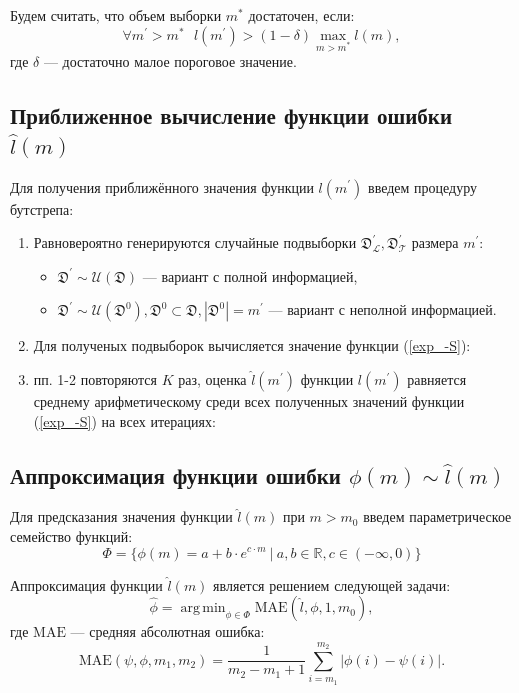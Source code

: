 \documentclass[12pt, a4paper]{scrartcl}
\DeclareMathOperator*{\argmin}{arg\,min}
\theoremstyle{plain}
\theoremstyle{definition}
\begin{document}
Будем считать, что объем выборки $m^*$ достаточен, если:
$$
\forall m^{\prime} > m^* ~~~ l(m^{\prime}) > (1 - \delta)\max\limits_{m > m^*}l(m),
$$
где $\delta$ --- достаточно малое пороговое значение.

\subsection{Приближенное вычисление функции ошибки $\hat{l}(m)$}

Для получения приближённого значения функции $l(m^{\prime})$ введем процедуру бутстрепа:

\begin{enumerate}
	\item Равновероятно генерируются случайные подвыборки $\mathfrak D^{\prime}_{\mathcal{L}}, \mathfrak D^{\prime}_{\mathcal{T}}$ размера $m^{\prime}$:

	\begin{itemize}
		\item $\mathfrak D^{\prime} \sim \mathcal{U}(\mathfrak{D})$ --- вариант с полной информацией,
		\item $\mathfrak D^{\prime} \sim \mathcal{U}(\mathfrak{D}^0), \mathfrak{D}^0 \subset \mathfrak{D}, |\mathfrak{D}^0| = m^{\prime}$ --- вариант с неполной информацией.
	\end{itemize}
	\item Для полученых подвыборок вычисляется значение функции (\ref{exp_-S}):
	\item пп. 1-2 повторяются $K$ раз, оценка $\hat{l}(m^{\prime})$ функции $l(m^{\prime})$ равняется среднему арифметическому среди всех полученных значений функции (\ref{exp_-S}) на всех итерациях:
\end{enumerate}

\subsection{Аппроксимация функции ошибки $\phi(m) \sim \hat{l}(m)$}

Для предсказания значения функции $\hat{l}(m)$ при $m > m_0$ введем параметрическое семейство функций:
\begin{equation}\label{Phi}
\Phi = \{\phi(m) =  a + b\cdot e^{c \cdot m} ~|~ a, b \in \mathbb{R}, c \in (-\infty, 0)\}
\end{equation}

Аппроксимация функции  $\hat{l}(m)$ является решением следующей задачи:
\begin{equation}\label{argmin_MAPE}
\hat{\phi} =  \argmin_{\phi \in \Phi}\text{MAE}(\hat{l}, \phi, 1, m_0),
\end{equation}
где $\text{MAE}$ --- средняя абсолютная ошибка:
\begin{equation}\label{MAPE}
\text{MAE}(\psi, \phi, m_1, m_2) = \frac{1}{m_2 - m_1 + 1}\sum_{i=m_1}^{m_2}|\phi(i) - \psi(i)|.
\end{equation}
\end{document}
